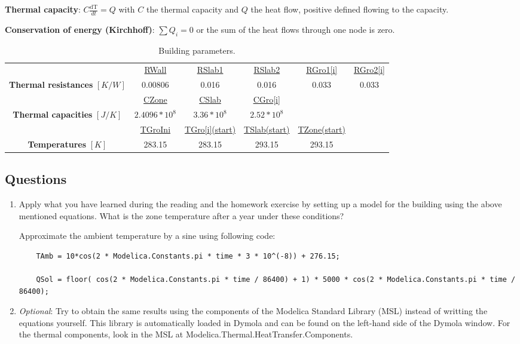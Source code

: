 \documentclass[10pt,a4paper]{article}
\begin{document}
\textbf{Thermal capacity}: $C \frac{\text{dT}}{dt} = Q$ with $C$ the thermal capacity and $Q$ the heat flow, positive defined flowing to the capacity.

\textbf{Conservation of energy (Kirchhoff)}: $ \sum Q_i = 0$ or the sum of the heat flows through one node is zero.



\begin{table}[hbtp]
	\centering 
\begin{tabular}{|c|ccccc|}
\hline 
  & \underline{RWall} & \underline{RSlab1} & \underline{RSlab2} & \underline{RGro1[i]} & \underline{RGro2[i]} \\  
\textbf{Thermal resistances} $[K/W]$ & 0.00806 & 0.016 & 0.016 & 0.033 & 0.033 \\ 
\hline\hline 
  & \underline{CZone} & \underline{CSlab} & \underline{CGro[i]} &   &   \\  
\textbf{Thermal capacities} $[J/K]$ & $2.4096 * 10^8$ & $3.36 * 10^8$ & $2.52*10^8$ &   &   \\ 
\hline\hline
  & \underline{TGroIni} & \underline{TGro[i](start)} & \underline{TSlab(start)} & \underline{TZone(start)} &  \\  
\textbf{Temperatures} $[K]$ &  283.15 & 283.15 & 293.15 & 293.15 & \\ 
\hline 
\end{tabular} 
\caption{ Building parameters.}
\label{tab:par}
\end{table}




\subsection*{Questions}

\begin{enumerate}
\item Apply what you have learned during the reading and the homework exercise by setting up a model for the building using the above mentioned equations. What is the zone temperature after a year under these conditions?

Approximate the ambient temperature by a sine using following code:
	\begin{lstlisting}
	TAmb = 10*cos(2 * Modelica.Constants.pi * time * 3 * 10^(-8)) + 276.15;
	
	QSol = floor( cos(2 * Modelica.Constants.pi * time / 86400) + 1) * 5000 * cos(2 * Modelica.Constants.pi * time / 86400);
\end{lstlisting}

\item \textit{Optional}: Try to obtain the same results using the components of the Modelica Standard Library (MSL) instead of writting the equations yourself. This library is automatically loaded in Dymola and can be found on the left-hand side of the Dymola window. For the thermal components, look in the MSL at Modelica.Thermal.HeatTransfer.Components.   \linebreak[15]
\end{enumerate}
\end{document}
